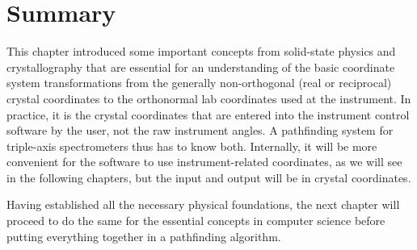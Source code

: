 \section{Summary}
This chapter introduced some important concepts from solid-state physics and crystallography that are essential
for an understanding of the basic coordinate system transformations from the generally non-orthogonal (real or 
reciprocal) crystal coordinates to the orthonormal lab coordinates used at the instrument.
In practice, it is the crystal coordinates that are entered into the instrument control software by
the user, not the raw instrument angles. A pathfinding system for triple-axis spectrometers thus has to know both.
Internally, it will be more convenient for the software to use instrument-related coordinates, as we will see in 
the following chapters, but the input and output will be in crystal coordinates.

Having established all the necessary physical foundations, the next chapter will proceed to do the same for the 
essential concepts in computer science before putting everything together in a pathfinding algorithm.
